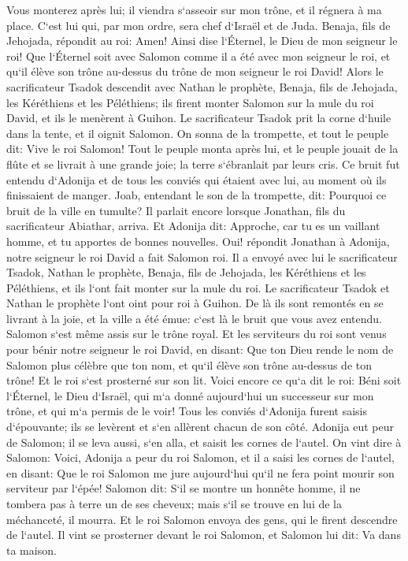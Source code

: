 \verse Vous monterez après lui; il viendra s`asseoir sur mon trône, et il régnera à ma place. C`est lui qui, par mon ordre, sera chef d`Israël et de Juda. 
\verse Benaja, fils de Jehojada, répondit au roi: Amen! Ainsi dise l`Éternel, le Dieu de mon seigneur le roi! 
\verse Que l`Éternel soit avec Salomon comme il a été avec mon seigneur le roi, et qu`il élève son trône au-dessus du trône de mon seigneur le roi David! 
\verse Alors le sacrificateur Tsadok descendit avec Nathan le prophète, Benaja, fils de Jehojada, les Kéréthiens et les Péléthiens; ils firent monter Salomon sur la mule du roi David, et ils le menèrent à Guihon. 
\verse Le sacrificateur Tsadok prit la corne d`huile dans la tente, et il oignit Salomon. On sonna de la trompette, et tout le peuple dit: Vive le roi Salomon! 
\verse Tout le peuple monta après lui, et le peuple jouait de la flûte et se livrait à une grande joie; la terre s`ébranlait par leurs cris. 
\verse Ce bruit fut entendu d`Adonija et de tous les conviés qui étaient avec lui, au moment où ils finissaient de manger. Joab, entendant le son de la trompette, dit: Pourquoi ce bruit de la ville en tumulte? 
\verse Il parlait encore lorsque Jonathan, fils du sacrificateur Abiathar, arriva. Et Adonija dit: Approche, car tu es un vaillant homme, et tu apportes de bonnes nouvelles. 
\verse Oui! répondit Jonathan à Adonija, notre seigneur le roi David a fait Salomon roi. 
\verse Il a envoyé avec lui le sacrificateur Tsadok, Nathan le prophète, Benaja, fils de Jehojada, les Kéréthiens et les Péléthiens, et ils l`ont fait monter sur la mule du roi. 
\verse Le sacrificateur Tsadok et Nathan le prophète l`ont oint pour roi à Guihon. De là ils sont remontés en se livrant à la joie, et la ville a été émue: c`est là le bruit que vous avez entendu. 
\verse Salomon s`est même assis sur le trône royal. 
\verse Et les serviteurs du roi sont venus pour bénir notre seigneur le roi David, en disant: Que ton Dieu rende le nom de Salomon plus célèbre que ton nom, et qu`il élève son trône au-dessus de ton trône! Et le roi s`est prosterné sur son lit. 
\verse Voici encore ce qu`a dit le roi: Béni soit l`Éternel, le Dieu d`Israël, qui m`a donné aujourd`hui un successeur sur mon trône, et qui m`a permis de le voir! 
\verse Tous les conviés d`Adonija furent saisis d`épouvante; ils se levèrent et s`en allèrent chacun de son côté. 
\verse Adonija eut peur de Salomon; il se leva aussi, s`en alla, et saisit les cornes de l`autel. 
\verse On vint dire à Salomon: Voici, Adonija a peur du roi Salomon, et il a saisi les cornes de l`autel, en disant: Que le roi Salomon me jure aujourd`hui qu`il ne fera point mourir son serviteur par l`épée! 
\verse Salomon dit: S`il se montre un honnête homme, il ne tombera pas à terre un de ses cheveux; mais s`il se trouve en lui de la méchanceté, il mourra. 
\verse Et le roi Salomon envoya des gens, qui le firent descendre de l`autel. Il vint se prosterner devant le roi Salomon, et Salomon lui dit: Va dans ta maison. 

